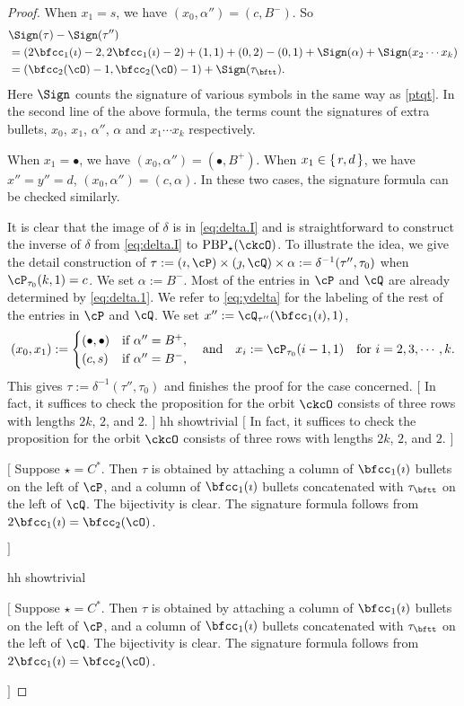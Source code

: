 \documentclass[12pt,a4paper]{amsart}
\newcommand{\trivial}[2][]{\if\relax\detokenize{#1}\relax
  {%
      \color{orange} \vspace{0em} $[$  #2 $]$
      \color{black}
  }
  \else
\ifx#1h
\ifcsname showtrivial\endcsname
{%
    \color{orange} \vspace{0em}  $[$ #2 $]$
    \color{black}
}
\fi
\else {\red Wrong argument!} \fi
\fi
}
\numberwithin{equation}{section}
\theoremstyle{remark}
\def\PBP{\mathrm{PBP}}
\begin{document}
\begin{proof}
When $x_{1} = s$, we have $(x_{0}, \alpha'') = (c,B^{-})$.
So
\begin{equation}\label{eq:sign.GD2}
  \begin{split}
    & \Sign(\tau) - \Sign(\tau'') \\
    &= (2\bfcc_{1}(\imath)-2,2\bfcc_{1}(\imath)-2)
    + (1,1) + (0,2) - (0,1) + \Sign(\alpha) + \Sign(x_{2}\cdots x_{k})\\
    & = (\bfcc_{2}(\cO)-1, \bfcc_{2}(\cO)-1)+ \Sign(\tau_{\bftt}).
  \end{split}
\end{equation}
Here $\Sign$ counts the signature of various symbols in the same way as
\eqref{ptqt}. In the second line of the above formula, the terms count the
signatures of extra bullets, $x_{0}$, $x_{1}$, $\alpha''$, $\alpha$ and
$x_{1}\cdots x_{k}$ respectively.

When $x_{1} = \bullet$, we have $(x_{0}, \alpha'') = (\bullet,B^{+})$. When
$x_{1} \in \set{r,d}$, we have $x'' = y''= d$, $(x_{0}, \alpha'') = (c,\alpha)$.
In these two cases, the signature formula can be checked similarly.

\smallskip

It is clear that the image of $\delta$ is in \eqref{eq:delta.I} and is
straightforward to construct the inverse of $\delta$ from \eqref{eq:delta.I} to
$\PBP_{\star}(\ckcO)$. To illustrate the idea, we give the detail construction
of $\tau:=(\imath,\cP)\times (\jmath,\cQ)\times
\alpha:=\delta^{-1}(\tau'',\tau_{0})$ when $\cP_{\tau_{0}}(k,1)=c$. We set
$\alpha:=B^{-}$. Most of the entries in $\cP$ and $\cQ$ are already determined
by
\eqref{eq:delta.1}. We refer to \eqref{eq:ydelta} for the labeling of the rest
of the entries in $\cP$ and $\cQ$. We set  $x'':= \cQ_{\tau''}(\bfcc_{1}(\imath),1)$,
\[
(x_{0},x_{1}) := \begin{cases}
  (\bullet,\bullet) & \text{if } \alpha''= B^{+},\\
  (c,s) & \text{if } \alpha''= B^{-},
\end{cases}
\quad \text{and}\quad
x_{i} := \cP_{\tau_{0}}(i-1,1) \quad \text{for } i = 2,3,\cdots,k.
\]
This gives $\tau := \delta^{-1}(\tau'',\tau_0)$ and finishes the proof for the case concerned.
\trivial[h]{
In fact, it suffices to check the proposition for the orbit $\ckcO$
consists of three rows with lengths $2k$, $2$, and $2$.
}
\trivial[h]{
  Suppose $\star =  C^{*}$.
  Then $\tau$ is obtained by attaching a column of $\bfcc_{1}(\imath)$
  bullets on the left of $\cP$, and a column of  $\bfcc_{1}(\imath)$
  bullets concatenated with $\tau_{\bftt}$ on the left of $\cQ$. The bijectivity is clear. The
  signature formula follows from $2\bfcc_{1}(\imath)  = \bfcc_{2}(\cO)$.


}
\end{proof}
\end{document}
